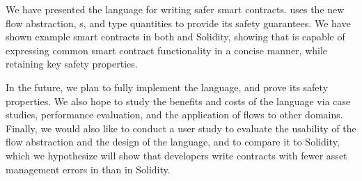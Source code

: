 \documentclass[nonacm, dvipsnames, sigconf]{acmart}
\begin{document}
We have presented the \langName language for writing safer smart contracts.
\langName uses the new flow abstraction, \assetTxt{}s, and type quantities to provide its safety guarantees.
We have shown example smart contracts in both \langName and Solidity, showing that \langName is capable of expressing common smart contract functionality in a concise manner, while retaining key safety properties.

In the future, we plan to fully implement the \langName language, and prove its safety properties.
We also hope to study the benefits and costs of the language via case studies, performance evaluation, and the application of flows to other domains.
Finally, we would also like to conduct a user study to evaluate the usability of the flow abstraction and the design of the language, and to compare it to Solidity, which we hypothesize will show that developers write contracts with fewer asset management errors in \langName than in Solidity.



\end{document}
